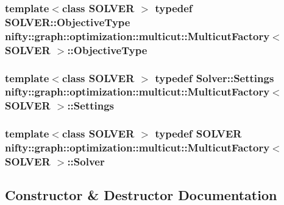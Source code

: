 \subsubsection[{Objective\+Type}]{\setlength{\rightskip}{0pt plus 5cm}template$<$class S\+O\+L\+V\+E\+R $>$ typedef S\+O\+L\+V\+E\+R\+::\+Objective\+Type {\bf nifty\+::graph\+::optimization\+::multicut\+::\+Multicut\+Factory}$<$ S\+O\+L\+V\+E\+R $>$\+::{\bf Objective\+Type}}\label{classnifty_1_1graph_1_1optimization_1_1multicut_1_1MulticutFactory_a8dbd5d6d65fab1f0cd111e277b70013c}
\hypertarget{classnifty_1_1graph_1_1optimization_1_1multicut_1_1MulticutFactory_a59e296190af4bb842b57a7e00fa27022}{}
\subsubsection[{Settings}]{\setlength{\rightskip}{0pt plus 5cm}template$<$class S\+O\+L\+V\+E\+R $>$ typedef Solver\+::\+Settings {\bf nifty\+::graph\+::optimization\+::multicut\+::\+Multicut\+Factory}$<$ S\+O\+L\+V\+E\+R $>$\+::{\bf Settings}}\label{classnifty_1_1graph_1_1optimization_1_1multicut_1_1MulticutFactory_a59e296190af4bb842b57a7e00fa27022}
\hypertarget{classnifty_1_1graph_1_1optimization_1_1multicut_1_1MulticutFactory_aeaf52672dd781d20a30a4ddc6b3f7ded}{}
\subsubsection[{Solver}]{\setlength{\rightskip}{0pt plus 5cm}template$<$class S\+O\+L\+V\+E\+R $>$ typedef S\+O\+L\+V\+E\+R {\bf nifty\+::graph\+::optimization\+::multicut\+::\+Multicut\+Factory}$<$ S\+O\+L\+V\+E\+R $>$\+::{\bf Solver}}\label{classnifty_1_1graph_1_1optimization_1_1multicut_1_1MulticutFactory_aeaf52672dd781d20a30a4ddc6b3f7ded}


\subsection{Constructor \& Destructor Documentation}
\hypertarget{classnifty_1_1graph_1_1optimization_1_1multicut_1_1MulticutFactory_ad747dc5e9b8e8dff5b63e634e74a7bb7}{}
